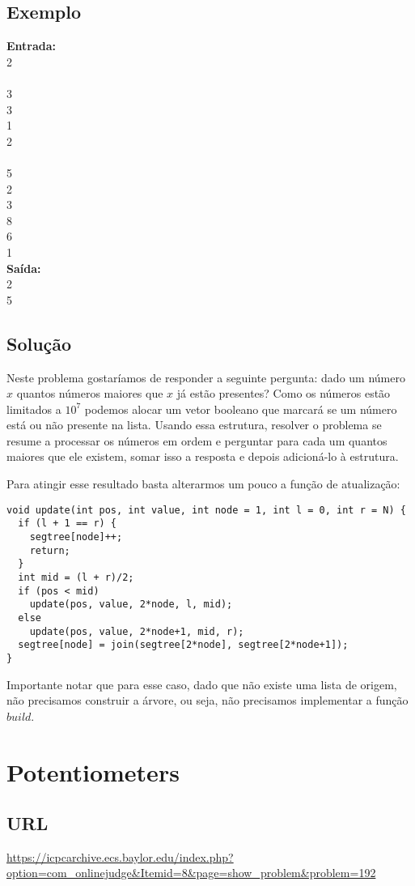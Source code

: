\subsection{Exemplo}
\textbf{Entrada:} \\
2\\
\\
3\\
3\\
1\\
2\\
\\
5\\
2\\
3\\
8\\
6\\
1\\

\textbf{Saída:} \\
2\\
5\\
\subsection{Solução}
Neste problema gostaríamos de responder a seguinte pergunta: dado um número $x$ quantos números maiores que $x$ já estão presentes? Como os números estão limitados a $10^7$ podemos alocar um vetor booleano que marcará se um número está ou não presente na lista. Usando essa estrutura, resolver o problema se resume a processar os números em ordem e perguntar para cada um quantos maiores que ele existem, somar isso a resposta e depois adicioná-lo à estrutura.

Para atingir esse resultado basta alterarmos um pouco a função de atualização:
\begin{lstlisting}
void update(int pos, int value, int node = 1, int l = 0, int r = N) {
  if (l + 1 == r) {
    segtree[node]++;
    return;
  }
  int mid = (l + r)/2;
  if (pos < mid)
    update(pos, value, 2*node, l, mid);
  else
    update(pos, value, 2*node+1, mid, r);
  segtree[node] = join(segtree[2*node], segtree[2*node+1]);
}
\end{lstlisting}
Importante notar que para esse caso, dado que não existe uma lista de origem, não precisamos construir a árvore, ou seja, não precisamos implementar a função $build$.

\section{Potentiometers}
\subsection{URL}
\url{https://icpcarchive.ecs.baylor.edu/index.php?option=com_onlinejudge&Itemid=8&page=show_problem&problem=192}

